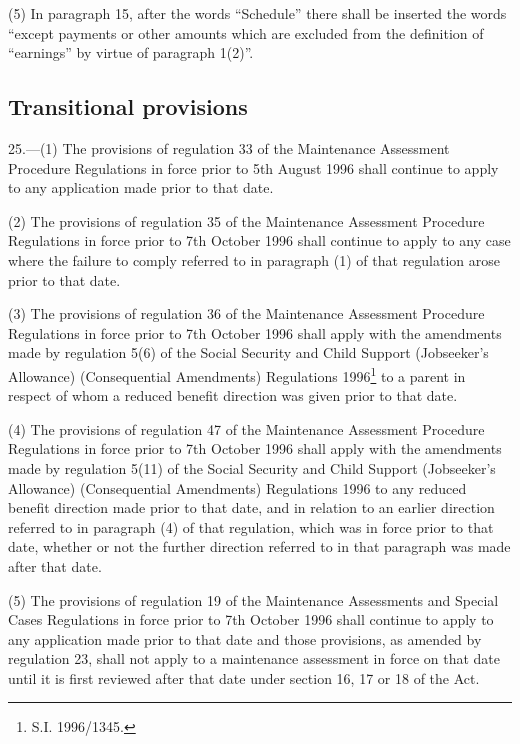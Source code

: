 \documentclass[a4paper]{article}
\begin{document}
(5) In paragraph 15, after the words “Schedule” there shall be inserted the words “except payments or other amounts which are excluded from the definition of “earnings” by virtue of paragraph 1(2)”.

\subsection[25. Transitional provisions]{Transitional provisions}

25.—(1) The provisions of regulation 33 of the Maintenance Assessment Procedure Regulations in force prior to 5th August 1996 shall continue to apply to any application made prior to that date.

(2) The provisions of regulation 35 of the Maintenance Assessment Procedure Regulations in force prior to 7th October 1996 shall continue to apply to any case where the failure to comply referred to in paragraph (1) of that regulation arose prior to that date.

(3) The provisions of regulation 36 of the Maintenance Assessment Procedure Regulations in force prior to 7th October 1996 shall 
apply with the amendments made by regulation 5(6) of the Social Security and Child Support (Jobseeker’s Allowance) (Consequential Amendments) Regulations 1996\footnote{\frenchspacing S.I. 1996/1345.}  %
to a parent in respect of whom a reduced benefit direction was given prior to that date.

(4) The provisions of regulation 47 of the Maintenance Assessment Procedure Regulations in force prior to 7th October 1996 shall 
apply with the amendments made by regulation 5(11) of the Social Security and Child Support (Jobseeker’s Allowance) (Consequential Amendments) Regulations 1996  %
to any reduced benefit direction made prior to that date, and in relation to an earlier direction referred to in paragraph (4) of that regulation, which was in force prior to that date, whether or not the further direction referred to in that paragraph was made after that date.

(5) The provisions of regulation 19 of the Maintenance Assessments and Special Cases Regulations in force prior to 7th October 1996 shall continue to apply to any application made prior to that date and those provisions, as amended by regulation 23, shall not apply to a maintenance assessment in force on that date until it is first reviewed after that date under section 16, 17 or 18 of the Act.
\end{document}
